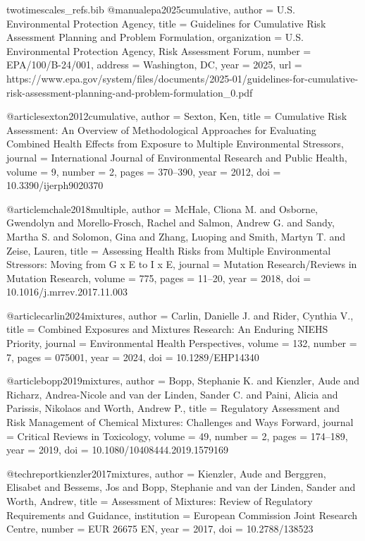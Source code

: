 \begin{filecontents*}{twotimescales_refs.bib}
@manual{epa2025cumulative,
  author       = {{U.S. Environmental Protection Agency}},
  title        = {Guidelines for Cumulative Risk Assessment Planning and Problem Formulation},
  organization = {U.S. Environmental Protection Agency, Risk Assessment Forum},
  number       = {EPA/100/B-24/001},
  address      = {Washington, DC},
  year         = {2025},
  url          = {https://www.epa.gov/system/files/documents/2025-01/guidelines-for-cumulative-risk-assessment-planning-and-problem-formulation_0.pdf}
}

@article{sexton2012cumulative,
  author  = {Sexton, Ken},
  title   = {Cumulative Risk Assessment: An Overview of Methodological Approaches for Evaluating Combined Health Effects from Exposure to Multiple Environmental Stressors},
  journal = {International Journal of Environmental Research and Public Health},
  volume  = {9},
  number  = {2},
  pages   = {370--390},
  year    = {2012},
  doi     = {10.3390/ijerph9020370}
}

@article{mchale2018multiple,
  author  = {McHale, Cliona M. and Osborne, Gwendolyn and Morello-Frosch, Rachel and Salmon, Andrew G. and Sandy, Martha S. and Solomon, Gina and Zhang, Luoping and Smith, Martyn T. and Zeise, Lauren},
  title   = {Assessing Health Risks from Multiple Environmental Stressors: Moving from G x E to I x E},
  journal = {Mutation Research/Reviews in Mutation Research},
  volume  = {775},
  pages   = {11--20},
  year    = {2018},
  doi     = {10.1016/j.mrrev.2017.11.003}
}

@article{carlin2024mixtures,
  author  = {Carlin, Danielle J. and Rider, Cynthia V.},
  title   = {Combined Exposures and Mixtures Research: An Enduring NIEHS Priority},
  journal = {Environmental Health Perspectives},
  volume  = {132},
  number  = {7},
  pages   = {075001},
  year    = {2024},
  doi     = {10.1289/EHP14340}
}

@article{bopp2019mixtures,
  author  = {Bopp, Stephanie K. and Kienzler, Aude and Richarz, Andrea-Nicole and van der Linden, Sander C. and Paini, Alicia and Parissis, Nikolaos and Worth, Andrew P.},
  title   = {Regulatory Assessment and Risk Management of Chemical Mixtures: Challenges and Ways Forward},
  journal = {Critical Reviews in Toxicology},
  volume  = {49},
  number  = {2},
  pages   = {174--189},
  year    = {2019},
  doi     = {10.1080/10408444.2019.1579169}
}

@techreport{kienzler2017mixtures,
  author      = {Kienzler, Aude and Berggren, Elisabet and Bessems, Jos and Bopp, Stephanie and van der Linden, Sander and Worth, Andrew},
  title       = {Assessment of Mixtures: Review of Regulatory Requirements and Guidance},
  institution = {European Commission Joint Research Centre},
  number      = {EUR 26675 EN},
  year        = {2017},
  doi         = {10.2788/138523}
}


\end{filecontents*}
